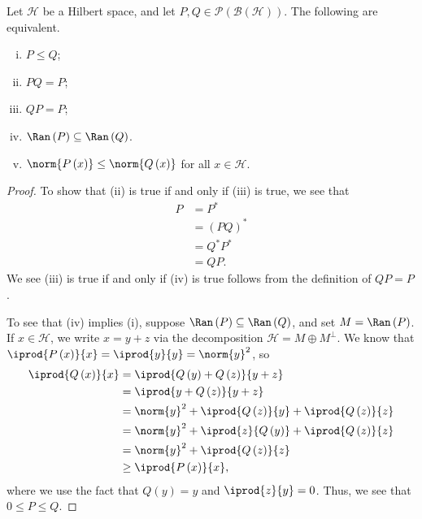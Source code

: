 \documentclass[10pt]{mypackage}
\begin{document}
\begin{proposition}
  Let $\mathcal{H}$ be a Hilbert space, and let $P,Q\in \mathcal{P}\left(\mathcal{B}\left(\mathcal{H}\right)\right)$. The following are equivalent.
  \begin{enumerate}[(i)]
    \item $P\leq Q$;
    \item $PQ = P$;
    \item $QP = P$;
    \item $\Ran\left(P\right)\subseteq \Ran\left(Q\right)$.
    \item $\norm{P\left(x\right)}\leq \norm{Q\left(x\right)}$ for all $x\in \mathcal{H}$.
  \end{enumerate}
\end{proposition}
\begin{proof}
  To show that (ii) is true if and only if (iii) is true, we see that
  \begin{align*}
    P &= P^{\ast}\\
      &= \left(PQ\right)^{\ast}\\
      &= Q^{\ast}P^{\ast}\\
      &= QP.
  \end{align*}
  We see (iii) is true if and only if (iv) is true follows from the definition of $QP = P$.\newline

  To see that (iv) implies (i), suppose $\Ran\left(P\right)\subseteq \Ran\left(Q\right)$, and set $M = \Ran\left(P\right)$. If $x\in \mathcal{H}$, we write $x = y + z$ via the decomposition $\mathcal{H} = M \oplus M^{\perp}$. We know that $ \iprod{P\left(x\right)}{x} = \iprod{y}{y} = \norm{y}^2$, so
  \begin{align*}
    \iprod{Q\left(x\right)}{x} &= \iprod{Q\left(y\right) + Q\left(z\right)}{y + z}\\
                               &= \iprod{y + Q\left(z\right)}{y+z}\\
                               &= \norm{y}^2 + \iprod{Q\left(z\right)}{y} + \iprod{Q\left(z\right)}{z}\\
                               &= \norm{y}^2 + \iprod{z}{Q\left(y\right)} + \iprod{Q\left(z\right)}{z}\\
                               &= \norm{y}^2 + \iprod{Q\left(z\right)}{z}\\
                               &\geq \iprod{P\left(x\right)}{x},
  \end{align*}
  where we use the fact that $Q(y) = y$ and $ \iprod{z}{y} = 0 $. Thus, we see that $0 \leq P \leq Q$.\newline


\end{proof}
\end{document}
